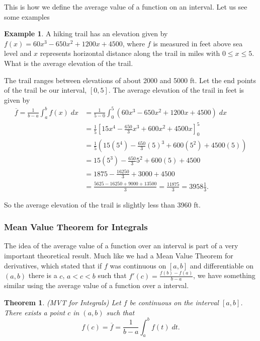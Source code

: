 \documentclass[12pt,reqno]{article}
\newtheorem{Theorem}{Theorem}
\theoremstyle{definition}
\newtheorem*{Example}{Example}
\begin{document}
This is how we define the average value of a function on an interval. Let us see some examples 
\begin{Example}
	A hiking trail has an elevation given by $f(x) = 60x^3 - 650 x^2 + 1200 x + 4500$, where $f$ is measured in feet above sea level and $x$ represents horizontal distance along the trail in miles with $0 \leq x \leq 5$. What is the average elevation of the trail. 
	
	The trail ranges between elevations of about 2000 and 5000 ft. Let the end points of the trail be our interval, $[0, 5]$. The average elevation of the trail in feet is given by 
	\begin{align*}
		\overline{f} = \frac{1}{b - a} \int_{a}^{b} f(x) \; dx &= \frac{1}{5 - 0} \int_{0}^{5} (60 x^3 - 650 x^2 + 1200 x + 4500) \;dx \\
		&= \frac{1}{5} \left[ 15 x^{4} - \frac{650}{3} x^3 + 600 x^2 + 4500 x\right]_{0}^{5} \\
		&= \frac{1}{5} \left( 15 (5^4) - \frac{650}{3} (5)^3 + 600 (5^2) + 4500 (5) \right) \\
		&= 15 (5^3) - \frac{650}{3} 5^2 + 600(5) + 4500 \\
		&= 1875 - \frac{16250}{3} + 3000 + 4500 \\
		&= \frac{5625 - 16250 + 9000 + 13500}{3} = \frac{11875}{3} = 3958\frac{1}{3}.
	\end{align*}

	So the average elevation of the trail is slightly less than 3960 ft. 
\end{Example}

\subsubsection{Mean Value Theorem for Integrals} 

The idea of the average value of a function over an interval is part of a very important theoretical result. Much like we had a Mean Value Theorem for derivatives, which stated that if $f$ was continuous on $[a, b]$ and differentiable on $(a, b)$ there is a $c$, $a < c < b$ such that $f'(c) = \frac{f(b) - f(a)}{b - a}$, we have something similar using the average value of a function over a interval. 

\begin{Theorem}
	(MVT for Integrals) Let $f$ be continuous on the interval $[a, b]$. There exists a point $c$ in $(a, b)$ such that $$f(c) = \overline{f} = \frac{1}{b - a} \int_{a}^{b} f(t) \; dt.$$ 
\end{Theorem}
\end{document}
